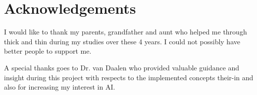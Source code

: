 \chapter{Acknowledgements}

I would like to thank my parents, grandfather and aunt who helped me through thick and thin during my studies over these 4 years. I could not possibly have better people to support me.

A special thanks goes to Dr. van Daalen who provided valuable guidance and insight during this project with respects to the implemented concepts their-in and also for increasing my interest in AI.